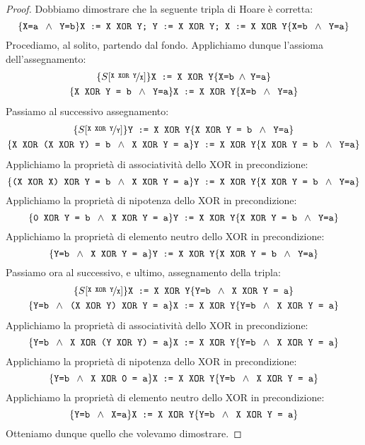 \begin{proof}
Dobbiamo dimostrare che la seguente tripla di Hoare è corretta:
\[
  \{ \text{\texttt{X=a }} \land \text{\texttt{ Y=b}} \} 
  \text{\texttt{X := X XOR Y; Y := X XOR Y; X := X XOR Y}}
  \{\text{\texttt{X=b }} \land \text{\texttt{ Y=a}} \}
\]
Procediamo, al solito, partendo dal fondo. Applichiamo dunque l'assioma dell'assegnamento:
\begin{gather*}
  \{ S[\nicefrac{\text{\texttt{X XOR Y}}}{\text{\texttt{X}}}] \}
  \text{\texttt{X := X XOR Y}}
  \{\text{\texttt{X=b}} \; \land \; \text{\texttt{Y=a}} \} 
\\
  \{\text{\texttt{X XOR Y = b }} \land \text{\texttt{ Y=a}}  \} 
  \text{\texttt{X := X XOR Y}}
  \{\text{\texttt{X=b }} \land \text{\texttt{ Y=a}} \}
\end{gather*}
Passiamo al successivo assegnamento:
\begin{gather*}
  \{ S[\nicefrac{\text{\texttt{X XOR Y}}}{\text{\texttt{Y}}} ] \}
  \text{\texttt{Y := X XOR Y}}
  \{\text{\texttt{X XOR Y = b }} \land \text{\texttt{ Y=a}} \}
\\
  \{ \text{\texttt{X XOR (X XOR Y) = b }} \land \text{\texttt{ X XOR Y = a}} \}
  \text{\texttt{Y := X XOR Y}}
  \{ \text{\texttt{X XOR Y = b }} \land \text{\texttt{ Y=a}} \}
\end{gather*}
Applichiamo la proprietà di associatività dello XOR in precondizione:
\[
  \{ \text{\texttt{(X XOR X) XOR Y = b }} \land \text{\texttt{ X XOR Y = a}} \}
  \texttt{Y := X XOR Y}
  \{ \text{\texttt{X XOR Y = b }} \land \text{\texttt{ Y=a}} \}
\]
Applichiamo la proprietà di nipotenza dello XOR in precondizione:
\[
  \{ \text{\texttt{0 XOR Y = b }} \land \text{\texttt{ X XOR Y = a}} \}
  \text{\texttt{Y := X XOR Y}}
  \{ \text{\texttt{X XOR Y = b }} \land \text{\texttt{ Y=a}} \}
\]
Applichiamo la proprietà di elemento neutro dello XOR in precondizione:
\[
  \{ \text{\texttt{Y=b }} \land \text{\texttt{ X XOR Y = a}} \}
  \text{\texttt{Y := X XOR Y}}
  \{ \text{\texttt{X XOR Y = b }} \land \text{\texttt{ Y=a}} \}
\]
Passiamo ora al successivo, e ultimo, assegnamento della tripla:
\begin{gather*}
  \{ S[\nicefrac{\text{\texttt{X XOR Y}}}{\text{\texttt{X}}} ] \}
  \text{\texttt{X := X XOR Y}}
  \{ \text{\texttt{Y=b }} \land \text{\texttt{ X XOR Y = a}} \}
\\
  \{ \text{\texttt{Y=b }} \land \text{\texttt{ (X XOR Y) XOR Y = a}} \}
  \text{\texttt{X := X XOR Y}}
  \{ \text{\texttt{Y=b }} \land \text{\texttt{ X XOR Y = a}} \}
\end{gather*}
Applichiamo la proprietà di associatività dello XOR in precondizione:
\[
  \{ \text{\texttt{Y=b }} \land \text{\texttt{ X XOR (Y XOR Y) = a}} \}
  \text{\texttt{X := X XOR Y}}
  \{ \text{\texttt{Y=b }} \land \text{\texttt{ X XOR Y = a}} \}
\]
Applichiamo la proprietà di nipotenza dello XOR in precondizione:
\[
  \{ \text{\texttt{Y=b }} \land \text{\texttt{ X XOR 0 = a}} \}
  \texttt{X := X XOR Y}
  \{ \text{\texttt{Y=b }} \land \text{\texttt{ X XOR Y = a}} \}
\]
Applichiamo la proprietà di elemento neutro dello XOR in precondizione:
\[
  \{ \text{\texttt{Y=b }} \land \text{\texttt{ X=a}} \}
  \texttt{X := X XOR Y}
  \{ \text{\texttt{Y=b }} \land \text{\texttt{ X XOR Y = a}} \}
\]
Otteniamo dunque quello che volevamo dimostrare.
\end{proof}


